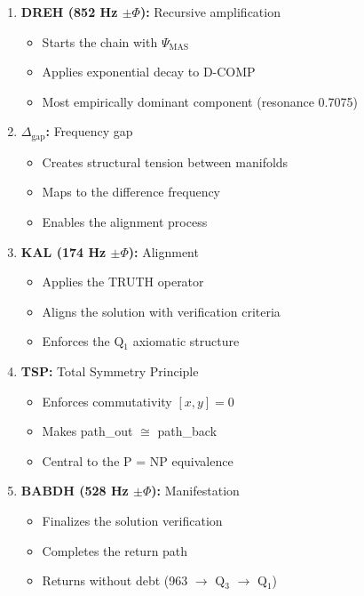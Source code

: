 \documentclass[11pt, letterpaper]{article}
\begin{document}
\begin{enumerate}
    \item \textbf{DREH (852 Hz $\pm \Phi$):} Recursive amplification
    \begin{itemize}
        \item Starts the chain with $\Psi_{\text{MAS}}$
        \item Applies exponential decay to D-COMP
        \item Most empirically dominant component (resonance 0.7075)
    \end{itemize}
    
    \item \textbf{$\Delta_{\text{gap}}$:} Frequency gap
    \begin{itemize}
        \item Creates structural tension between manifolds
        \item Maps to the difference frequency
        \item Enables the alignment process
    \end{itemize}
    
    \item \textbf{KAL (174 Hz $\pm \Phi$):} Alignment
    \begin{itemize}
        \item Applies the TRUTH operator
        \item Aligns the solution with verification criteria
        \item Enforces the Q$_1$ axiomatic structure
    \end{itemize}
    
    \item \textbf{TSP:} Total Symmetry Principle
    \begin{itemize}
        \item Enforces commutativity $[x, y] = 0$
        \item Makes path\_out $\cong$ path\_back
        \item Central to the P = NP equivalence
    \end{itemize}
    
    \item \textbf{BABDH (528 Hz $\pm \Phi$):} Manifestation
    \begin{itemize}
        \item Finalizes the solution verification
        \item Completes the return path
        \item Returns without debt (963 $\to$ Q$_3$ $\to$ Q$_1$)
    \end{itemize}
\end{enumerate}
\end{document}
